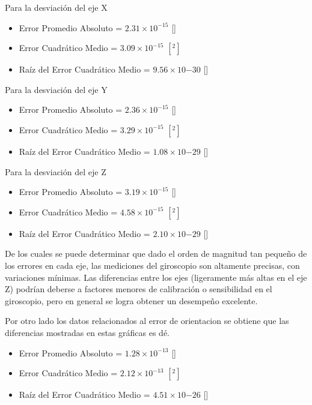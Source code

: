 Para la desviación del eje X


\begin{itemize}
    \item Error Promedio Absoluto = $2.31 \times 10^{-15}$ []
    \item Error Cuadrático Medio = $3.09 \times 10^{-15}$ $[^{2}]$
    \item Raíz del Error Cuadrático Medio = $9.56 \times 10{-30}$ []
\end{itemize}

Para la desviación del eje Y


\begin{itemize}
    \item Error Promedio Absoluto = $2.36 \times 10^{-15}$ []
    \item Error Cuadrático Medio = $3.29 \times 10^{-15}$ $[^{2}]$
    \item Raíz del Error Cuadrático Medio = $1.08 \times 10{-29}$ []
\end{itemize}


Para la desviación del eje Z


\begin{itemize}
    \item Error Promedio Absoluto = $3.19 \times 10^{-15}$ []
    \item Error Cuadrático Medio = $4.58 \times 10^{-15}$ $[^{2}]$
    \item Raíz del Error Cuadrático Medio = $2.10 \times 10{-29}$ []
\end{itemize}


De los cuales se puede determinar que dado el orden de magnitud tan pequeño de los errores en cada eje, las mediciones del giroscopio son altamente precisas, con variaciones mínimas. Las diferencias entre los ejes (ligeramente más altas en el eje Z) podrían deberse a factores menores de calibración o sensibilidad en el giroscopio, pero en general se logra obtener un desempeño excelente.


Por otro lado los datos relacionados al error de orientacion se obtiene que las diferencias mostradas en estas gráficas es dé.


\begin{itemize}
    \item Error Promedio Absoluto = $1.28 \times 10^{-13}$ []
    \item Error Cuadrático Medio = $2.12 \times 10^{-13}$ $[^{2}]$
    \item Raíz del Error Cuadrático Medio = $4.51 \times 10{-26}$ []
\end{itemize}


